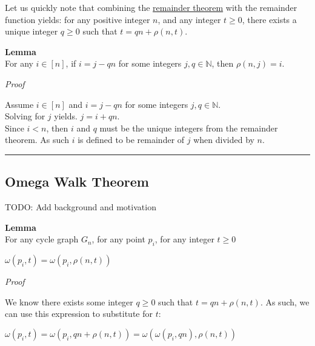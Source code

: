\documentclass[a4paper,12pt]{article}
\begin{document}
\noindent Let us quickly note that combining the \hyperlink{theorem:remainder}{remainder theorem} with the remainder function yields: for any positive integer $n$, and any integer $t \geq 0$, there exists a unique integer $q \geq 0$ such that $t = qn + \rho(n, t)$.\\


\label{lemma:remainder_subtraction}
\hypertarget{lemma:remainder_subtraction}{}
\begin{tcolorbox}
\textbf{Lemma}\\
For any $i \in [n]$, if $i = j - qn$ for some integers $j, q \in \mathbb{N}$, then $\rho(n, j) = i$.
\end{tcolorbox}

\noindent
\textit{Proof}

\noindent Assume $i \in [n]$ and $i = j - qn$ for some integers $j, q \in \mathbb{N}$.\\

\noindent Solving for $j$ yields. $j = i + qn$.\\

\noindent Since $i < n$, then $i$ and $q$ must be the unique integers from the remainder theorem. As such $i$ is defined to be remainder of $j$ when divided by $n$. 
\begin{center}
\noindent\rule{8cm}{0.4pt}
\end{center}



\subsection{Omega Walk Theorem}
\label{sec:omega_walk_theorem}

\noindent TODO: Add background and motivation\\

\label{lemma:omega_rho_reduction}
\hypertarget{lemma:omega_rho_reduction}{}
\begin{tcolorbox}
\textbf{Lemma}\\
For any cycle graph $G_n$, for any point $p_i$, for any integer $t \geq 0$
\begin{center}
$\omega(p_i, t) = \omega(p_i, \rho(n, t))$
\end{center}
\end{tcolorbox}

\noindent
\textit{Proof}

\noindent We know there exists some integer $q \geq 0$ such that $t = qn + \rho(n,t)$. As such, we can use this expression to substitute for $t$:
\begin{center}
$\omega(p_i, t) = \omega(p_i, qn + \rho(n, t)) = \omega(\omega(p_i, qn), \rho(n, t))$
\end{center}
\end{document}
